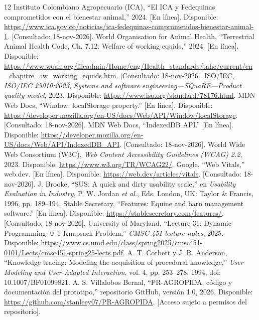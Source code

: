 \documentclass[conference,10pt]{IEEEtran}
\begin{document}
\balance
\begin{thebibliography}{12}
 Instituto Colombiano Agropecuario (ICA), ``El ICA y Fedequinas comprometidos con el bienestar animal,'' 2024. [En línea]. Disponible: \url{https://www.ica.gov.co/noticias/ica-fedequinas-comprometidos-bienestar-animal-1}. [Consultado: 18-nov-2026].
 World Organisation for Animal Health, ``Terrestrial Animal Health Code, Ch. 7.12: Welfare of working equids,'' 2024. [En línea]. Disponible: \url{https://www.woah.org/fileadmin/Home/eng/Health_standards/tahc/current/en_chapitre_aw_working_equids.htm}. [Consultado: 18-nov-2026].
 ISO/IEC, \emph{ISO/IEC 25010:2023, Systems and software engineering---SQuaRE---Product quality model}, 2023. Disponible: \url{https://www.iso.org/standard/78176.html}.
 MDN Web Docs, ``Window: localStorage property.'' [En línea]. Disponible: \url{https://developer.mozilla.org/en-US/docs/Web/API/Window/localStorage}. [Consultado: 18-nov-2026].
 MDN Web Docs, ``IndexedDB API.'' [En línea]. Disponible: \url{https://developer.mozilla.org/en-US/docs/Web/API/IndexedDB_API}. [Consultado: 18-nov-2026].
 World Wide Web Consortium (W3C), \emph{Web Content Accessibility Guidelines (WCAG) 2.2}, 2023. Disponible: \url{https://www.w3.org/TR/WCAG22/}.
 Google, ``Web Vitals,'' web.dev. [En línea]. Disponible: \url{https://web.dev/articles/vitals}. [Consultado: 18-nov-2026].
 J. Brooke, ``SUS: A quick and dirty usability scale,'' en \emph{Usability Evaluation in Industry}, P. W. Jordan \emph{et al.}, Eds. London, UK: Taylor \& Francis, 1996, pp. 189--194.
 Stable Secretary, ``Features: Equine and barn management software.'' [En línea]. Disponible: \url{https://stablesecretary.com/features/}. [Consultado: 18-nov-2026].
 University of Maryland, ``Lecture 31: Dynamic Programming: 0--1 Knapsack Problem,'' \emph{CMSC 451 lecture notes}, 2025. Disponible: \url{https://www.cs.umd.edu/class/spring2025/cmsc451-0101/Lects/cmsc451-spring25-lects.pdf}.
 A. T. Corbett y J. R. Anderson, ``Knowledge tracing: Modeling the acquisition of procedural knowledge,'' \emph{User Modeling and User-Adapted Interaction}, vol. 4, pp. 253--278, 1994, doi: 10.1007/BF01099821.
 A. S. Villalobos Bernal, ``PR-AGROPIDA, código y documentación del prototipo,'' repositorio GitHub, versión 1.0, 2026. Disponible: \url{https://github.com/stanleey07/PR-AGROPIDA}. [Acceso sujeto a permisos del repositorio].
\end{thebibliography}
\end{document}

